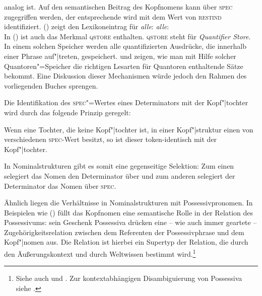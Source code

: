 analog ist. Auf den semantischen Beitrag des Kopfnomens kann über \textsc{spec} zugegriffen werden,
der entsprechende \contw wird mit dem Wert von \textsc{restind} identifiziert. ()
zeigt den Lexikoneintrag für \emph{alle}:
\eas
\emph{alle}:\\
\zs
In () ist auch das Merkmal \textsc{qstore} enthalten. \textsc{qstore} steht für \emph{Quantifier Store}.
In einem solchen Speicher werden alle quantifizierten Ausdrücke, die innerhalb einer Phrase auf"|treten,
gespeichert. \citet[Kapitel~8]{ps2} und \citet{PY98a-u} zeigen, wie man mit
Hilfe solcher Quantoren"=Speicher die richtigen Lesarten für Quantoren enthaltende Sätze
bekommt. Eine Diskussion dieser Mechanismen würde jedoch den Rahmen des vorliegenden Buches
sprengen.%


Die Identifikation des \textsc{spec}"=Wertes eines Determinators mit der Kopf"|tochter
wird durch das folgende Prinzip geregelt:
\begin{prinzip-break} 
\label{prinzip-spec}
Wenn eine Tochter, die keine Kopf"|tochter ist, in einer Kopf"|struktur
einen von  verschiedenen \textsc{spec}-Wert besitzt, so ist dieser token-identisch mit
der Kopf"|tochter.
\end{prinzip-break}
In Nominalstrukturen gibt es somit eine gegenseitige Selektion: Zum einen selegiert das
Nomen den Determinator über \comps und zum anderen selegiert der Determinator das Nomen
über \textsc{spec}.

Ähnlich liegen die Verhältnisse in Nominalstrukturen mit Possessivpronomen.
In Beispielen wie () füllt das Kopfnomen eine semantische Rolle in der Relation des Possessivums:
\ea
sein Geschenk
\z
Possessiva drücken eine -- wie auch immer geartete -- Zugehörigkeitsrelation
zwischen dem Referenten der Possessivphrase und dem Kopf"|nomen
aus. Die Relation  ist hierbei ein Supertyp
der Relation, die durch den Äußerungskontext und durch Weltwissen 
bestimmt wird.\footnote{
        Siehe auch  und .           %
        Zur kontextabhängigen Disambiguierung von Possessiva siehe
        .
}
 
